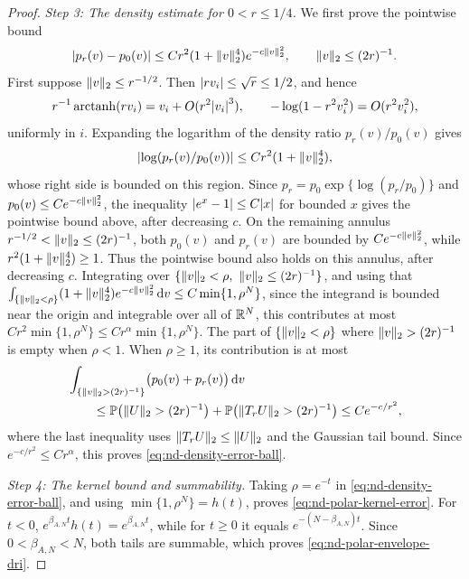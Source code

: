 \documentclass[11pt,reqno,a4paper]{article}
\newcommand{\Pp}{\P}
\DeclareMathOperator{\arctanh}{arctanh}
\begin{document}
\begin{proof}
  \emph{Step 3: The density estimate for $0<r\leq1/4$.}
  We first prove the pointwise bound
  \begin{equation*}
    \abs{p_r(v)-p_0(v)}
    \leq
    C r^2(1+\norm v_2^4)e^{-c\norm v_2^2},
    \qquad \norm v_2\leq(2r)^{-1}.
  \end{equation*}
  First suppose
  $\lVert v\rVert_2\leq r^{-1/2}$. Then
  $\abs{rv_i}\leq\sqrt r\leq1/2$, and hence
  \begin{equation*}
    r^{-1}\arctanh(rv_i)
    =
    v_i+O(r^2\abs{v_i}^3),
    \qquad
    -\log(1-r^2v_i^2)=O(r^2v_i^2),
  \end{equation*}
  uniformly in $i$. Expanding the logarithm of the density ratio
  $p_r(v)/p_0(v)$ gives
  \begin{equation*}
    \abs{\log(p_r(v)/p_0(v))}
    \leq
    C r^2(1+\norm v_2^4),
  \end{equation*}
  whose right side is bounded on this region. Since
  $p_r=p_0\exp\{\log(p_r/p_0)\}$ and $p_0(v)\leq Ce^{-c\lVert v\rVert_2^2}$, the
  inequality $\abs{e^x-1}\leq C\abs x$ for bounded $x$ gives the pointwise
  bound above, after decreasing $c$. On the remaining
  annulus $r^{-1/2}<\lVert v\rVert_2\leq(2r)^{-1}$, both $p_0(v)$ and $p_r(v)$ are
  bounded by $Ce^{-c\lVert v\rVert_2^2}$, while
  $r^2(1+\lVert v\rVert_2^4)\geq1$. Thus the pointwise bound also holds on this
  annulus, after decreasing $c$.
  Integrating over
  $\{\lVert v\rVert_2<\rho,\ \lVert v\rVert_2\leq(2r)^{-1}\}$, and using that
  $\int_{\{\lVert v\rVert_2<\rho\}}(1+\lVert v\rVert_2^4)e^{-c\lVert v\rVert_2^2}\,\mathrm{d}v
  \leq C\min\{1,\rho^N\}$, since the integrand is bounded near the origin and
  integrable over all of $\mathbb{R}^N$, this contributes at most
  $Cr^2\min\{1,\rho^{N}\}\leq Cr^\alpha\min\{1,\rho^N\}$.
  The part of $\{\lVert v\rVert_2<\rho\}$ where
  $\lVert v\rVert_2>(2r)^{-1}$ is empty when $\rho<1$. When $\rho\geq1$, its
  contribution is at most
  \begin{align*}
    &\int_{\{\norm v_2>(2r)^{-1}\}}
      \bigl(p_0(v)+p_r(v)\bigr)\,\mathrm{d}v
    \\
    &\qquad\leq
    \Pp\bigl(\norm U_2>(2r)^{-1}\bigr)
    +\Pp\bigl(\norm{T_rU}_2>(2r)^{-1}\bigr)
    \leq Ce^{-c/r^2},
  \end{align*}
  where the last inequality uses $\lVert T_rU\rVert_2\leq\lVert U\rVert_2$ and the
  Gaussian tail bound. Since $e^{-c/r^2}\leq Cr^\alpha$, this proves
  \cref{eq:nd-density-error-ball}.

  \emph{Step 4: The kernel bound and summability.}
  Taking $\rho=e^{-t}$ in \cref{eq:nd-density-error-ball}, and using
  $\min\{1,\rho^N\}=h(t)$, proves
  \cref{eq:nd-polar-kernel-error}. For $t<0$,
  $e^{\beta_{A,N}t}h(t)=e^{\beta_{A,N}t}$, while for $t\geq0$ it equals
  $e^{-(N-\beta_{A,N})t}$. Since $0<\beta_{A,N}<N$, both tails are summable,
  which proves \cref{eq:nd-polar-envelope-dri}.
\end{proof}
\end{document}
